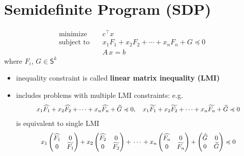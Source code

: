 \documentclass[11pt]{extarticle}
\theoremstyle{definition}
\newcommand\scalemath[2]{\scalebox{#1}{\mbox{\ensuremath{\displaystyle #2}}}}
\begin{document}
\section*{Semidefinite Program (SDP)}
\begin{align*}
  \text{minimize}\quad & c^\top x \\
  \text{subject to}\quad & x_1F_1 + x_2F_2 + \cdots + x_nF_n + G \preccurlyeq 0 \\
  \qquad\qquad &A\,x = b
\end{align*}
where $F_i$, $G\in\mathsf{S}^k$
\begin{itemize}
  \item inequality constraint is called {\bf linear matrix inequality (LMI)}
  \item includes problems with multiple LMI constraints: e.g.
    \begin{align*}
      \scalemath{0.9}{
      x_1\widehat{F_1} + x_2\widehat{F_2} + \cdots + x_n\widehat{F_n} + \widehat{G} \preccurlyeq 0, \quad x_1\widetilde{F_1} + x_2\widetilde{F_2} + \cdots + x_n\widetilde{F_n} + \widetilde{G} \preccurlyeq 0}
    \end{align*}
    is equivalent to single LMI
    \begin{align*}
      \scalemath{0.9}{
        x_1\begin{pmatrix}\widehat{F_1} & 0 \\ 0 & \widetilde{F_1}\end{pmatrix} + x_2\begin{pmatrix}\widehat{F_2} & 0 \\ 0 & \widetilde{F_2}\end{pmatrix} + \,\cdots\, + x_n\begin{pmatrix}\widehat{F_n} & 0 \\ 0 & \widetilde{F_n}\end{pmatrix} + \begin{pmatrix}\widehat{G} & 0 \\ 0 & \widetilde{G}\end{pmatrix} \preccurlyeq 0
    }
    \end{align*}
\end{itemize}

\newpage
\end{document}
